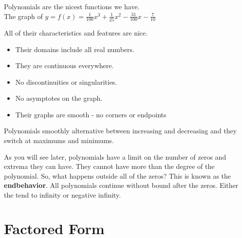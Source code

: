 \documentclass{ximera}
\begin{document}
Polynomials are the nicest functions we have. \\

The graph of $y = f(x) = \frac{1}{100} x^3 + \frac{1}{25} x^2 - \frac{31}{100} x - \frac{7}{10}$

\begin{image}
\end{image}



All of their characteristics and features are nice.

\begin{itemize}
\item Their domains include all real numbers. 
\item They are continuous everywhere.
\item No discontinuities or singularities.
\item No asymptotes on the graph.
\item Their graphs are smooth - no corners or endpoints
\end{itemize}


Polynomials smoothly alternative between increasing and decreasing and they switch at maximums and minimums.

As you will see later, polynomials have a limit on the number of zeros and extrema they can have.  They cannot have more than the degree of the polynomial. So, what happens outside all of the zeros?  This is known as the \textbf{endbehavior}.  All polynomials continue without bound after the zeros.  Either the tend to infinity or negative infinity.



\section{Factored Form}
\end{document}
